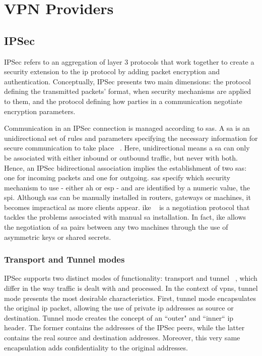 \documentclass[11pt,twoside,a4paper]{report}
\begin{document}
\section{VPN Providers}

\subsection{IPSec}

IPSec refers to an aggregation of layer 3 protocols that work together to create a security extension to the \ac{ip} protocol by adding packet encryption and authentication. Conceptually, IPSec presents two main dimensions: the protocol defining the transmitted packets' format, when security mechanisms are applied to them, and the protocol defining how parties in a communication negotiate encryption parameters.

Communication in an IPSec connection is managed according to \acp{sa}. A \ac{sa} is an unidirectional set of rules and parameters specifying the necessary information for secure communication to take place ~\cite{rfc4301}. Here, unidirectional means a \ac{sa} can only be associated with either inbound or outbound traffic, but never with both. Hence, an IPSec bidirectional association implies the establishment of two \acp{sa}: one for incoming packets and one for outgoing. \acp{sa} specify which security mechanism to use - either \ac{ah} or \ac{esp} - and are identified by a numeric value, the \ac{spi}. Although \ac{sa}s can be manually installed in routers, gateways or machines, it becomes impractical as more clients appear. \ac{ike} ~\cite{rfc7296} is a negotiation protocol that tackles the problems associated with manual \ac{sa} installation. In fact, \ac{ike} allows the negotiation of \ac{sa} pairs between any two machines through the use of asymmetric keys or shared secrets.

\subsubsection{Transport and Tunnel modes}

IPSec supports two distinct modes of functionality: transport and tunnel ~\cite{rfc4301}, which differ in the way traffic is dealt with and processed. In the context of \ac{vpn}s, tunnel mode presents the
most desirable characteristics. First, tunnel mode encapsulates the original \ac{ip} packet, allowing the use of private \ac{ip} addresses as source or destination. Tunnel mode creates the concept of an ``outer" and ``inner`` \ac{ip} header. The former contains the addresses of the IPSec peers, while the latter contains the real source and destination addresses. Moreover, this very same encapsulation adds confidentiality to the original addresses.
\end{document}
